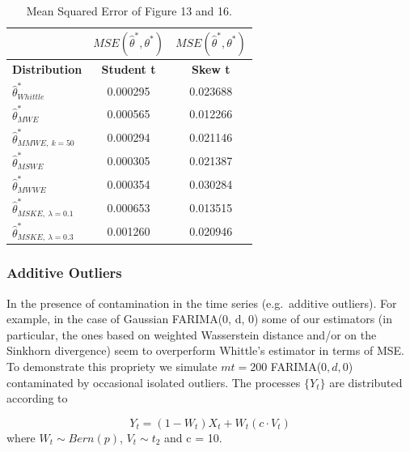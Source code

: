 \documentclass[
  11pt,
]{article}
\begin{document}
\begin{table}[h]
\centering
\begin{tabular}{|l|c|c|}
\hline
          & $MSE(\hat \theta^*, \theta^*)$   & $MSE(\hat \theta^*, \theta^*)$  \\ \hline
\textbf{Distribution} & \textbf{Student t}  & \textbf{Skew t}     \\ \hline
$\hat \theta^*_{Whittle}$                & 0.000295               & 0.023688             \\ \hline
$\hat \theta^*_{MWE}$                    & 0.000565               & 0.012266              \\ \hline
$\hat \theta^*_{MMWE, \ k = 50}$            & 0.000294              & 0.021146              \\ \hline
$\hat \theta^*_{MSWE}$                    & 0.000305               & 0.021387              \\ \hline
$\hat \theta^*_{MWWE}$                    & 0.000354               & 0.030284              \\ \hline
$\hat \theta^*_{MSKE, \ \lambda = 0.1}$                & 0.000653               & 0.013515              \\ \hline
$\hat \theta^*_{MSKE, \ \lambda = 0.3}$                 & 0.001260               & 0.020946             \\ \hline
\end{tabular}
\caption{Mean Squared Error of Figure 13 and 16.}
\label{tab:FARIMA_heavy_MSE}
\end{table}

\pagebreak

\hypertarget{additive-outliers}{%
\subsubsection{Additive Outliers}\label{additive-outliers}}

In the presence of contamination in the time series (e.g.~additive
outliers). For example, in the case of Gaussian FARIMA(0, d, 0) some
of our estimators (in particular, the ones based on weighted Wasserstein
distance and/or on the Sinkhorn divergence) seem to overperform
Whittle's estimator in terms of MSE. To demonstrate this propriety we
simulate \(mt = 200\) FARIMA(\(0,d,0\)) contaminated by occasional
isolated outliers. The processes \(\{Y_t\}\) are distributed according
to

\[Y_{t}=\left(1-W_{t}\right) X_{t}+W_{t}\left(c \cdot V_{t}\right)\]
where \(W_t \sim Bern(p)\), \(V_t \sim t_2\) and c = 10. 
\end{document}
